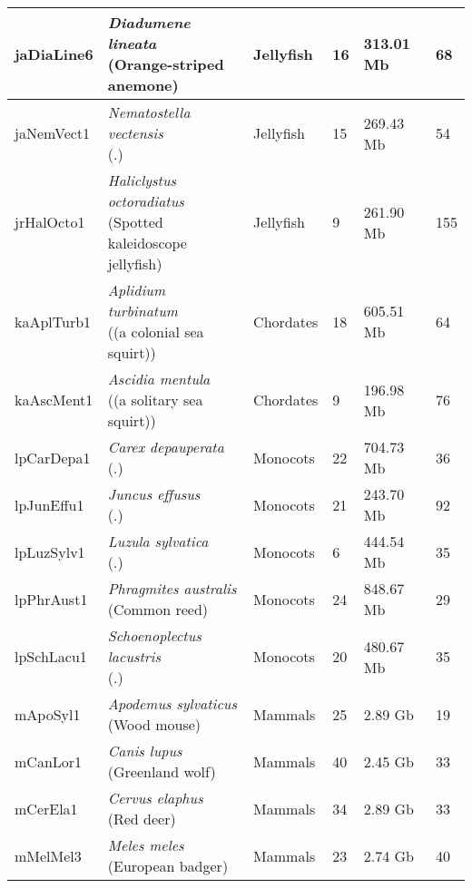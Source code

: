 \begin{centering}
\begin{longtable}{l|l|l|l|l|l}
jaDiaLine6 & \makecell[{l}]{\textit{Diadumene lineata} \\ (Orange-striped anemone)} & Jellyfish & 16 & 313.01 Mb & 68  \\ \hline
jaNemVect1 & \makecell[{l}]{\textit{Nematostella vectensis} \\ (.)} & Jellyfish & 15 & 269.43 Mb & 54  \\ \hline
jrHalOcto1 & \makecell[{l}]{\textit{Haliclystus octoradiatus} \\ (Spotted kaleidoscope jellyfish)} & Jellyfish & 9 & 261.90 Mb & 155  \\ \hline
kaAplTurb1 & \makecell[{l}]{\textit{Aplidium turbinatum} \\ ((a colonial sea squirt))} & Chordates & 18 & 605.51 Mb & 64  \\ \hline
kaAscMent1 & \makecell[{l}]{\textit{Ascidia mentula} \\ ((a solitary sea squirt))} & Chordates & 9 & 196.98 Mb & 76  \\ \hline
lpCarDepa1 & \makecell[{l}]{\textit{Carex depauperata} \\ (.)} & Monocots & 22 & 704.73 Mb & 36  \\ \hline
lpJunEffu1 & \makecell[{l}]{\textit{Juncus effusus} \\ (.)} & Monocots & 21 & 243.70 Mb & 92  \\ \hline
lpLuzSylv1 & \makecell[{l}]{\textit{Luzula sylvatica} \\ (.)} & Monocots & 6 & 444.54 Mb & 35  \\ \hline
lpPhrAust1 & \makecell[{l}]{\textit{Phragmites australis} \\ (Common reed)} & Monocots & 24 & 848.67 Mb & 29  \\ \hline
lpSchLacu1 & \makecell[{l}]{\textit{Schoenoplectus lacustris} \\ (.)} & Monocots & 20 & 480.67 Mb & 35  \\ \hline
mApoSyl1 & \makecell[{l}]{\textit{Apodemus sylvaticus} \\ (Wood mouse)} & Mammals & 25 & 2.89 Gb & 19  \\ \hline
mCanLor1 & \makecell[{l}]{\textit{Canis lupus} \\ (Greenland wolf)} & Mammals & 40 & 2.45 Gb & 33  \\ \hline
mCerEla1 & \makecell[{l}]{\textit{Cervus elaphus} \\ (Red deer)} & Mammals & 34 & 2.89 Gb & 33  \\ \hline
mMelMel3 & \makecell[{l}]{\textit{Meles meles} \\ (European badger)} & Mammals & 23 & 2.74 Gb & 40  \\ \hline

\end{longtable}
\end{centering}
